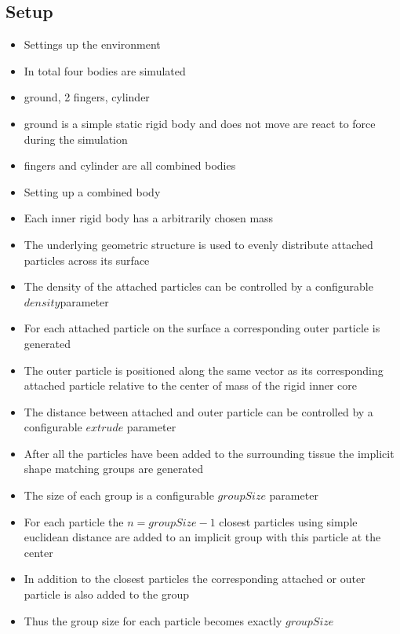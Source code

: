 \subsection{Setup}
\begin{itemize}
\item Settings up the environment
\item In total four bodies are simulated
\item ground, 2 fingers, cylinder
\item ground is a simple static rigid body and does not move are react to force during the simulation
\item fingers and cylinder are all combined bodies
\item Setting up a combined body
\item Each inner rigid body has a arbitrarily chosen mass
\item The underlying geometric structure is used to evenly distribute attached particles across its surface
\item The density of the attached particles can be controlled by a configurable $density$parameter
\item For each attached particle on the surface a corresponding outer particle is generated
\item The outer particle is positioned along the same vector as its corresponding attached particle relative to the center of mass of the rigid inner core
\item The distance between attached and outer particle can be controlled by a configurable $extrude$ parameter
\item After all the particles have been added to the surrounding tissue the implicit shape matching groups are generated
\item The size of each group is a configurable $groupSize$ parameter
\item For each particle the $n = groupSize - 1$ closest particles using simple euclidean distance are added to an implicit group with this particle at the center
\item In addition to the closest particles the corresponding attached or outer particle is also added to the group
\item Thus the group size for each particle becomes exactly $groupSize$
\end{itemize}
